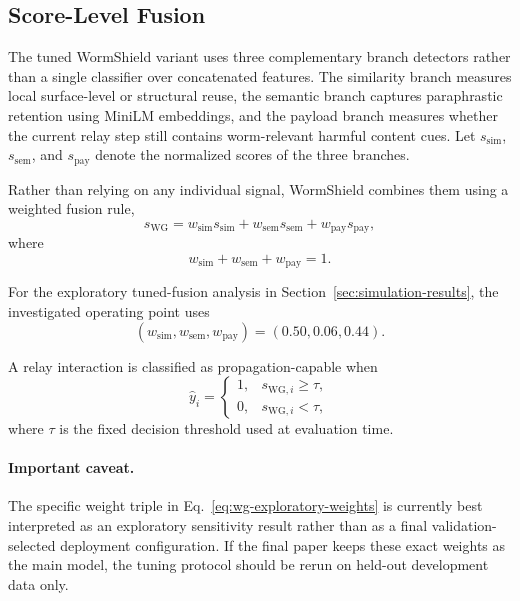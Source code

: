 
\subsection{Score-Level Fusion}

The tuned WormShield variant uses three complementary branch
detectors rather than a single classifier over concatenated
features. The similarity branch measures local surface-level or
structural reuse, the semantic branch captures paraphrastic
retention using MiniLM embeddings, and the payload branch measures
whether the current relay step still contains worm-relevant harmful
content cues. Let $s_{\mathrm{sim}}$,
$s_{\mathrm{sem}}$, and $s_{\mathrm{pay}}$ denote the normalized
scores of the three branches.

Rather than relying on any individual signal, WormShield combines
them using a weighted fusion rule,
\begin{equation}
s_{\mathrm{WG}} =
w_{\mathrm{sim}} s_{\mathrm{sim}} +
w_{\mathrm{sem}} s_{\mathrm{sem}} +
w_{\mathrm{pay}} s_{\mathrm{pay}},
\label{eq:wg-score-fusion}
\end{equation}
where
\begin{equation}
w_{\mathrm{sim}} + w_{\mathrm{sem}} + w_{\mathrm{pay}} = 1.
\end{equation}

For the exploratory tuned-fusion analysis in
Section~\ref{sec:simulation-results}, the investigated operating
point uses
\begin{equation}
(w_{\mathrm{sim}}, w_{\mathrm{sem}}, w_{\mathrm{pay}})
=
(0.50, 0.06, 0.44).
\label{eq:wg-exploratory-weights}
\end{equation}

A relay interaction is classified as propagation-capable when
\begin{equation}
\hat{y}_{i} =
\begin{cases}
1, & s_{\mathrm{WG}, i} \geq \tau, \\
0, & s_{\mathrm{WG}, i} < \tau,
\end{cases}
\label{eq:wg-threshold}
\end{equation}
where $\tau$ is the fixed decision threshold used at evaluation
time.

\paragraph*{Important caveat.}
The specific weight triple in
Eq.~\ref{eq:wg-exploratory-weights} is currently best interpreted
as an exploratory sensitivity result rather than as a final
validation-selected deployment configuration. If the final paper
keeps these exact weights as the main model, the tuning protocol
should be rerun on held-out development data only.
